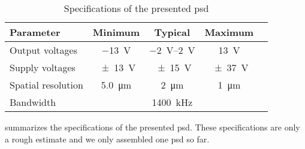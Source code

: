\begin{table}[htb]
  \centering
  \begin{tabular}{lcccc}
    \toprule
      Parameter & Minimum & Typical & Maximum \\
    \midrule
      Output voltages & \SI{-13}{\volt} & \SIrange{-2}{+2}{\volt} & \SI{+13}{\volt} \\
      Supply voltages & \SI{\pm13}{\volt} & \SI{\pm15}{\volt} & \SI{\pm37}{\volt} \\
      Spatial resolution & \SI{5.0}{\micro\meter} & \SI{2}{\micro\meter} & \SI{1}{\micro\meter} \\
      Bandwidth & & \SI{1400}{\kilo\hertz} & \\
    \bottomrule
  \end{tabular}
  \captionsetup{width=.8\textwidth}
  \caption{Specifications of the presented \gls{psd}}\label{tab:specifications}
\end{table}
 summarizes the specifications of the presented \gls{psd}.
These specifications are only a rough estimate and we only assembled one \gls{psd} so far.